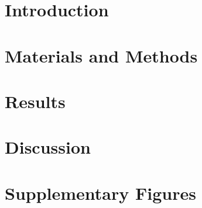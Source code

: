 \documentclass[12pt]{article}
\begin{document}
\newpage
\pagestyle{fancy}
\fancyhf{}
\renewcommand{\headrulewidth}{0pt}

\section{Introduction} 

	



\newpage
\section{Materials and Methods} 


\newpage
\section{Results} 


\newpage
\section{Discussion} 


\newpage



\section{Supplementary Figures}

\end{document}
